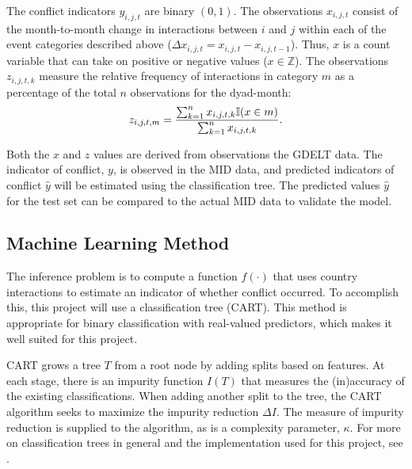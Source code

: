 \documentclass[12pt,letterpaper]{article} %
\begin{document}
The conflict indicators $y_{i,j,t}$ are binary $(0,1)$. The observations $x_{i,j,t}$ consist of the month-to-month change in interactions between $i$ and $j$ within each of the event categories described above ($\Delta x_{i,j,t} = x_{i,j,t} - x_{i,j,t-1}$). Thus, $x$ is a count variable that can take on positive or negative values ($x \in \mathbb{Z}$). The observations $z_{i,j,t,k}$ measure the relative frequency of interactions in category $m$ as a percentage of the total $n$ observations for the dyad-month: 
\begin{eqnarray*}
z_{i,j,t,m} = {\sum_{k=1}^n x_{i,j,t,k} \mathbb{I}(x \in m)  \over \sum_{k=1}^n x_{i,j,t,k} }.
\end{eqnarray*}


Both the $x$ and $z$ values are derived from observations the GDELT data. The indicator of conflict, $y$, is observed in the MID data, and predicted indicators of conflict $\hat{y}$ will be estimated using the classification tree. The predicted values $\hat{y}$ for the test set can be compared to the actual MID data to validate the model.


\subsection{Machine Learning Method}


The inference problem is to compute a function $f(\cdot)$ that uses country interactions to estimate an indicator of whether conflict occurred. To accomplish this, this project will use a classification tree (CART). This method is appropriate for binary classification with real-valued predictors, which makes it well suited for this project.

CART grows a tree $T$ from a root node by adding splits based on features. At each stage, there is an impurity function $I(T)$ that measures the (in)accuracy of the existing classifications. When adding another split to the tree, the CART algorithm seeks to maximize the impurity reduction $\Delta I$. The measure of impurity reduction is supplied to the algorithm, as is a complexity parameter, $\kappa$. 
For more on classification trees in general and the implementation used for this project, see \citep{murphy2012machine,olshen1984classification,therneau1997introduction}. 
\end{document}
